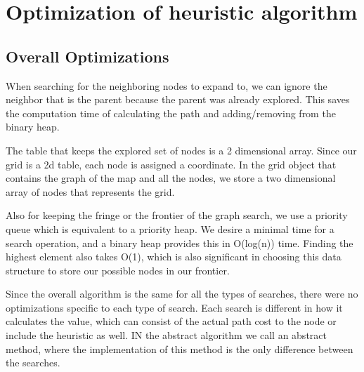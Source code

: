 \section{Optimization of heuristic algorithm}

\subsection{Overall Optimizations}

When searching for the neighboring nodes to expand to, we can ignore the neighbor that is the parent because the parent was already explored. This saves the computation time of calculating the path and adding/removing from the binary heap.

The table that keeps the explored set of nodes is a 2 dimensional array. Since our grid is a 2d table, each node is assigned a coordinate. In the grid object that contains the graph of the map and all the nodes, we store a two dimensional array of nodes that represents the grid.

Also for keeping the fringe or the frontier of the graph search, we use a priority queue which is equivalent to a priority heap. We desire a minimal time for a search operation, and a binary heap provides this in O(log(n)) time. Finding the highest element also takes O(1), which is also significant in choosing this data structure to store our possible nodes in our frontier.

Since the overall algorithm is the same for all the types of searches, there were no optimizations specific to each type of search. Each search is different in how it calculates the value, which can consist of the actual path cost to the node or include the heuristic as well. IN the abstract algorithm we call an abstract method, where the implementation of this method is the only difference between the searches.